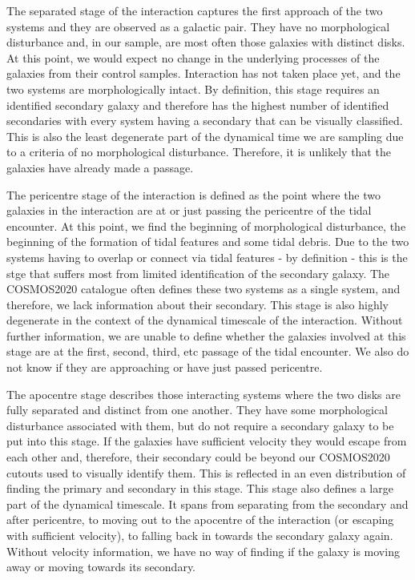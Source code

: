 The separated stage of the interaction captures the first approach of the two systems and they are observed as a galactic pair. They have no morphological disturbance and, in our sample, are most often those galaxies with distinct disks. At this point, we would expect no change in the underlying processes of the galaxies from their control samples. Interaction has not taken place yet, and the two systems are morphologically intact. By definition, this stage requires an identified secondary galaxy and therefore has the highest number of identified secondaries with every system having a secondary that can be visually classified. This is also the least degenerate part of the dynamical time we are sampling due to a criteria of no morphological disturbance. Therefore, it is unlikely that the galaxies have already made a passage.

The pericentre stage of the interaction is defined as the point where the two galaxies in the interaction are at or just passing the pericentre of the tidal encounter. At this point, we find the beginning of morphological disturbance, the beginning of the formation of tidal features and some tidal debris. Due to the two systems having to overlap or connect via tidal features - by definition - this is the stge that suffers most from limited identification of the secondary galaxy. The COSMOS2020 catalogue often defines these two systems as a single system, and therefore, we lack information about their secondary. This stage is also highly degenerate in the context of the dynamical timescale of the interaction. Without further information, we are unable to define whether the galaxies involved at this stage are at the first, second, third, etc passage of the tidal encounter. We also do not know if they are approaching or have just passed pericentre.

The apocentre stage describes those interacting systems where the two disks are fully separated and distinct from one another. They have some morphological disturbance associated with them, but do not require a secondary galaxy to be put into this stage. If the galaxies have sufficient velocity they would escape from each other and, therefore, their secondary could be beyond our COSMOS2020 cutouts used to visually identify them. This is reflected in an even distribution of finding the primary and secondary in this stage. This stage also defines a large part of the dynamical timescale. It spans from separating from the secondary and after pericentre, to moving out to the apocentre of the interaction (or escaping with sufficient velocity), to falling back in towards the secondary galaxy again. Without velocity information, we have no way of finding if the galaxy is moving away or moving towards its secondary.


